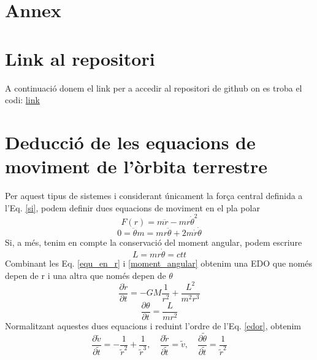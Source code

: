 \documentclass[11pt]{article}
\begin{document}
\section*{Annex}
\appendix

\section{Link al repositori}
\vspace{-1em}
A continuació donem el link per a accedir al repositori de github on es troba el codi: \href{https://github.com/isaacbg25/Sol/tree/main}{link}


\section{Deducció de les equacions de moviment de l'òrbita terrestre}
\label{annex: equ_mov}
Per aquest tipus de sistemes i considerant únicament la força central definida a l'Eq. \eqref{si}, podem definir dues equacions de moviment en el pla polar 
\begin{equation}
    F(r)=m\ddot{r}-mr{\dot{\theta}}^2
    \label{equ_en_r}
\end{equation}
\begin{equation}
    0=\ddot{\theta}m=mr\ddot{\theta}+2m\dot{r}\dot{\theta}
    \label{equ_en_theta}
\end{equation}
Si, a més, tenim en compte la conservació del moment angular, podem escriure
\begin{equation}
    L=mr\dot{\theta}=ctt
    \label{moment_angular}
\end{equation}
Combinant les Eq. \eqref{equ_en_r} i \eqref{moment_angular} obtenim una EDO que només depen de r i una altra que només depen de $\theta$
\begin{equation}
    \frac{\partial\dot{r}}{\partial t}=-GM\frac{1}{r^2}+\frac{L^2}{m^2r^3}
    \label{edor}
\end{equation}
\begin{equation}
    \frac{\partial\theta}{\partial t}=\frac{L}{mr^2}
    \label{edot}
\end{equation}
Normalitzant aquestes dues equacions i reduint l'ordre de l'Eq. \eqref{edor}, obtenim
\begin{equation}
    \frac{\partial\tilde{v}}{\partial\tilde{t}}=-\frac{1}{\tilde{r}^2}+\frac{1}{\tilde{r}^3}, \quad
    \frac{\partial\tilde{r}}{\partial\tilde{t}}=\tilde{v}, \quad
    \frac{\partial\tilde{\theta}}{\partial\tilde{t}}=\frac{1}{\tilde{r}^2}
    \label{eq:all}
\end{equation}
\end{document}

